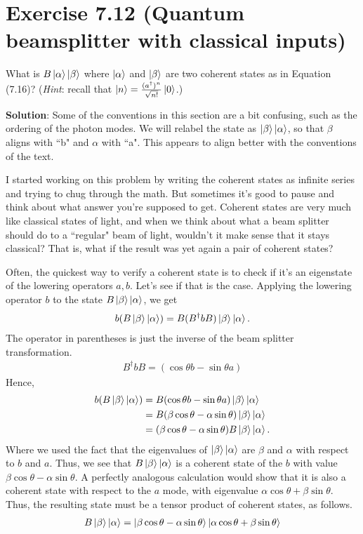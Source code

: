 \documentclass{book}
\begin{document}
\section*{Exercise 7.12 (Quantum beamsplitter with classical inputs)}
    What is $B\ket{\alpha}\ket{\beta}$ where $\ket{\alpha}$ and $\ket{\beta}$ are two coherent states as in Equation (7.16)? (\emph{Hint}: recall that $\ket{n} = \frac{(a^\dagger)^n}{\sqrt{n!}}\ket{0}$.)

    \textbf{Solution}: Some of the conventions in this section are a bit confusing, such as the ordering of the photon modes. We will relabel the state as $\ket{\beta}\ket{\alpha}$, so that $\beta$ aligns with ``b" and $\alpha$ with ``a". This appears to align better with the conventions of the text. 

    I started working on this problem by writing the coherent states as infinite series and trying to chug through the math. But sometimes it's good to pause and think about what answer you're supposed to get. Coherent states are very much like classical states of light, and when we think about what a beam splitter should do to a ``regular" beam of light, wouldn't it make sense that it stays classical? That is, what if the result was yet again a pair of coherent states?

    Often, the quickest way to verify a coherent state is to check if it's an eigenstate of the lowering operators $a,b$. Let's see if that is the case. Applying the lowering operator $b$ to the state $B\ket{\beta}\ket{\alpha}$, we get
    \begin{align}
        b (B \ket{\beta}\ket{\alpha}) = B (B^\dagger b B) \ket{\beta}\ket{\alpha}.
    \end{align}
    The operator in parentheses is just the inverse of the beam splitter transformation.
    \begin{align}
        B^\dagger b B = (\cos\theta b - \sin\theta a)
    \end{align}
    Hence, 
    \begin{align}
    \begin{aligned}
        b (B \ket{\beta}\ket{\alpha}) &= B (\cos\theta b - \sin\theta a) \ket{\beta}\ket{\alpha} \\
        &= B(\beta \cos\theta - \alpha \sin\theta) \ket{\beta}\ket{\alpha} \\
        &= (\beta \cos\theta - \alpha \sin\theta) B \ket{\beta}\ket{\alpha}.
    \end{aligned}
    \end{align}
    Where we used the fact that the eigenvalues of $\ket{\beta}\ket{\alpha}$ are $\beta$ and $\alpha$ with respect to $b$ and $a$. Thus, we see that $B \ket{\beta}\ket{\alpha}$ is a coherent state of the $b$ with value $\beta \cos\theta - \alpha \sin\theta$. A perfectly analogous calculation would show that it is also a coherent state with respect to the $a$ mode, with eigenvalue $\alpha \cos\theta + \beta \sin\theta$. Thus, the resulting state must be a tensor product of coherent states, as follows.
    \begin{align}
        B \ket{\beta} \ket{\alpha} = \ket{\beta \cos\theta - \alpha \sin\theta} \ket{\alpha \cos\theta + \beta \sin\theta}
    \end{align}
\end{document}
